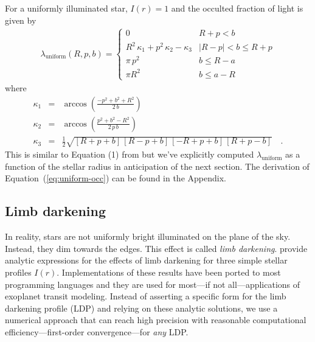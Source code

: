 \documentclass[12pt,preprint]{aastex}
\newcommand{\Eq}[1]{Equation~(\ref{eq:#1})}
\newcommand{\eq}[1]{\Eq{#1}}
\newcommand{\eqlabel}[1]{\label{eq:#1}}
\begin{document}
For a uniformly illuminated star, $I(r) = 1$ and the occulted fraction of
light is given by
\begin{eqnarray}\eqlabel{uniform-occ}
    \lambda_\mathrm{uniform} (R, p, b) = \left \{ \begin{array}{ll}
            0 & R + p < b \\
            R^2 \, \kappa_1 + p^2 \, \kappa_2 - \kappa_3
                & |R - p| < b \leq R + p \\
            \pi \, p^2 & b \leq R - a \\
            \pi R^2 & b \leq a - R
        \end{array} \right.
\end{eqnarray}
where
\begin{eqnarray}
    \kappa_1 & = & \arccos \left ( \frac{-p^2 + b^2 + R^2}{2 \, b} \right ) \\
    \kappa_2 & = & \arccos \left ( \frac{p^2 + b^2 - R^2}{2\, p \, b}
                           \right ) \\
    \kappa_3 & = & \frac{1}{2} \sqrt{[R + p + b] \, [R - p + b]
                        \, [-R + p + b] \, [R + p - b]} \quad.
\end{eqnarray}
This is similar to Equation (1) from \citet{mandel} but we've explicitly
computed $\lambda_\mathrm{uniform}$ as a function of the stellar radius in
anticipation of the next section. The derivation of \eq{uniform-occ} can be
found in the Appendix.


\subsection{Limb darkening}

In reality, stars are not uniformly bright illuminated on the plane of the
sky. Instead, they dim towards the edges. This effect is called
\emph{limb darkening}. \citet{mandel} provide analytic expressions for the
effects of limb darkening for three simple stellar profiles $I(r)$.
Implementations of these results have been ported to most programming
languages and they are used for most---if not all---applications of exoplanet
transit modeling. Instead of asserting a specific form for the limb darkening
profile (LDP) and relying on these analytic solutions, we use a numerical
approach that can reach high precision with reasonable computational
efficiency---first-order convergence---for \emph{any} LDP.
\end{document}
